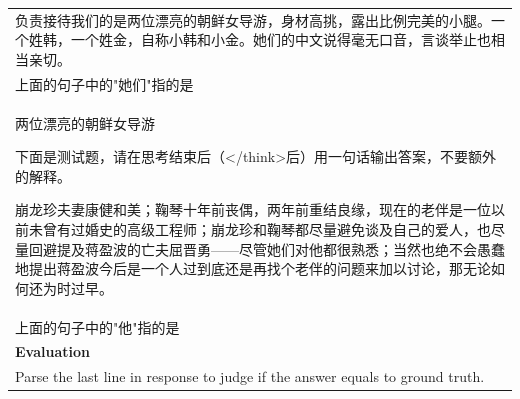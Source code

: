 \begin{table}[h]
\begin{tabular}{p{}}
负责接待我们的是两位漂亮的朝鲜女导游，身材高挑，露出比例完美的小腿。一个姓韩，一个姓金，自称小韩和小金。她们的中文说得毫无口音，言谈举止也相当亲切。\\
上面的句子中的"她们"指的是 \\
两位漂亮的朝鲜女导游

下面是测试题，请在思考结束后（</think>后）用一句话输出答案，不要额外的解释。

崩龙珍夫妻康健和美；鞠琴十年前丧偶，两年前重结良缘，现在的老伴是一位以前未曾有过婚史的高级工程师；崩龙珍和鞠琴都尽量避免谈及自己的爱人，也尽量回避提及蒋盈波的亡夫屈晋勇——尽管她们对他都很熟悉；当然也绝不会愚蠢地提出蒋盈波今后是一个人过到底还是再找个老伴的问题来加以讨论，那无论如何还为时过早。\\
上面的句子中的"他"指的是
\\ \hline
      \textbf{Evaluation}\\
      Parse the last line in response to judge if the answer equals to ground truth.
       \\ \hline
    \end{tabular}
\end{table}



